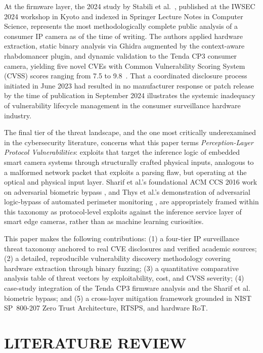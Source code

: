 \documentclass[letterpaper, 10pt, conference]{ieeeconf}
\begin{document}
At the firmware layer, the 2024 study by Stabili et al.~\cite{stabili2024},
published at the IWSEC 2024 workshop in Kyoto and indexed in Springer
Lecture Notes in Computer Science, represents the most methodologically
complete public analysis of a consumer IP camera as of the time of
writing. The authors applied hardware extraction, static binary analysis
via Ghidra augmented by the context-aware rhabdomancer plugin, and
dynamic validation to the Tenda CP3 consumer camera, yielding five
novel CVEs with Common Vulnerability Scoring System (CVSS) scores
ranging from 7.5 to 9.8~\cite{stabili2024}. That a coordinated
disclosure process initiated in June 2023 had resulted in no manufacturer
response or patch release by the time of publication in September 2024
illustrates the systemic inadequacy of vulnerability lifecycle management
in the consumer surveillance hardware industry.

The final tier of the threat landscape, and the one most critically
underexamined in the cybersecurity literature, concerns what this paper
terms \textit{Perception-Layer Protocol Vulnerabilities}: exploits that
target the inference logic of embedded smart camera systems through
structurally crafted physical inputs, analogous to a malformed network
packet that exploits a parsing flaw, but operating at the optical and
physical input layer. Sharif et al.'s foundational ACM CCS 2016
work on adversarial biometric bypass \cite{sharif2016}, and Thys
et al.'s demonstration of adversarial logic-bypass of automated perimeter
monitoring \cite{thys2019}, are appropriately framed within this
taxonomy as protocol-level exploits against the inference service layer
of smart edge cameras, rather than as machine learning curiosities.

This paper makes the following contributions: (1) a four-tier IP
surveillance threat taxonomy anchored to real CVE disclosures and
verified academic sources; (2) a detailed, reproducible vulnerability
discovery methodology covering hardware extraction through binary
fuzzing; (3) a quantitative comparative analysis table of threat
vectors by exploitability, cost, and CVSS severity; (4) case-study
integration of the Tenda CP3 firmware analysis and the Sharif et al.
biometric bypass; and (5) a cross-layer mitigation framework grounded
in NIST SP~800-207 Zero Trust Architecture, RTSPS, and hardware RoT.

\section{LITERATURE REVIEW}
\end{document}
